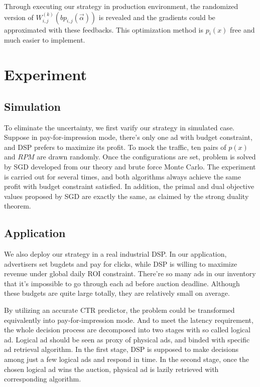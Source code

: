 \documentclass[sigconf]{acmart}
\newcommand{\sbp}{bp_{i,j}}
\newcommand{\sW}{W_{i,j}^{(k)}}
\newcommand{\valpha}{\vec{\alpha}}
\begin{document}
Through executing our strategy in production environment, the randomized version of $\sW(\sbp(\valpha))$ is revealed
    and the gradients could be approximated with these feedbacks.
This optimization method is $p_i(x)$ free and much easier to implement.

\newpage
\section{Experiment}

\subsection{Simulation}

To eliminate the uncertainty, we first varify our strategy in simulated case.
Suppose in pay-for-impression mode, there's only one ad with budget constraint, and DSP prefers to maximize its profit.
To mock the traffic, ten pairs of $p(x)$ and $RPM$ are drawn randomly.
Once the configurations are set, problem is solved by SGD developed from our theory and brute force Monte Carlo.
The experiment is carried out for several times, and both algorithms always achieve the same profit with budget constraint satisfied.
In addition, the primal and dual objective values proposed by SGD are exactly the same, as claimed by the strong duality theorem.

\subsection{Application}

We also deploy our strategy in a real industrial DSP.
In our application, advertisers set bugdets and pay for clicks, while DSP is willing to maximize revenue under global daily ROI constraint.
There're so many ads in our inventory that it's impossible to go through each ad before auction deadline.
Although these budgets are quite large totally, they are relatively small on average.

By utilizing an accurate CTR predictor, the problem could be transformed equivalently into pay-for-impression mode.
And to meet the latency requirement, the whole decision process are decomposed into two stages with so called logical ad.
Logical ad should be seen as proxy of physical ads, and binded with specific ad retrieval algorithm.
In the first stage, DSP is supposed to make decisions among just a few logical ads and respond in time.
In the second stage, once the chosen logical ad wins the auction, physical ad is lazily retrieved with corresponding algorithm.
\end{document}
